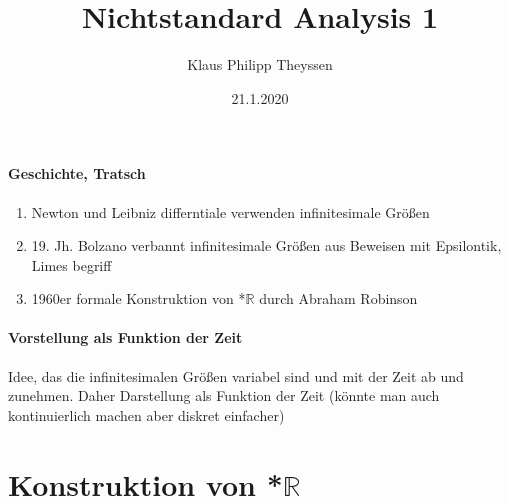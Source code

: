 \documentclass[a4paper]{article}
\title{Nichtstandard Analysis 1}
\date{21.1.2020}
\author{Klaus Philipp Theyssen}
\begin{document}


\paragraph{Geschichte, Tratsch}  
\begin{enumerate}
      \item Newton und Leibniz differntiale verwenden infinitesimale Größen 
      \item 19. Jh. Bolzano verbannt infinitesimale Größen aus Beweisen mit Epsilontik, Limes begriff
      \item 1960er formale Konstruktion von *$\mathbb{R}$ durch Abraham Robinson
\end{enumerate}


\paragraph{Vorstellung als Funktion der Zeit} Idee, das die infinitesimalen Größen variabel sind und mit der Zeit ab und zunehmen.
Daher Darstellung als Funktion der Zeit (könnte man auch kontinuierlich machen aber diskret einfacher)

\section{Konstruktion von *$\mathbb{R}$}
\end{document}
